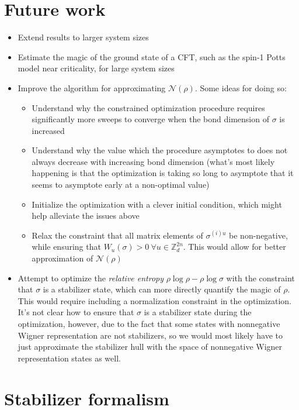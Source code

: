 \documentclass{article}
\begin{document}
\section{Future work}

\begin{itemize}
\item Extend results to larger system sizes
\item Estimate the magic of the ground state of a CFT, such as the spin-1 Potts model near criticality, for large system sizes
\item Improve the algorithm for approximating $\mathcal N(\rho)$. Some ideas for doing so:
	\begin{itemize}
	\item Understand why the constrained optimization procedure requires significantly more sweeps to converge when the bond dimension of $\sigma$ is increased
	\item Understand why the value which the procedure asymptotes to does not always decrease with increasing bond dimension (what's most likely happening is that the optimization is taking so long to asymptote that it seems to asymptote early at a non-optimal value)
	\item Initialize the optimization with a clever initial condition, which might help alleviate the issues above
	\item Relax the constraint that all matrix elements of $\sigma^{(i)u}$ be non-negative, while ensuring that $W_u(\sigma)>0\ \forall u\in \mathbb Z_d^{2n}$. This would allow for better approximation of $\mathcal N(\rho)$
	\end{itemize}
\item Attempt to optimize the \textit{relative entropy} \cite{Veitch_2014} $\rho \log \rho - \rho \log \sigma$ with the constraint that $\sigma$ is a stabilizer state, which can more directly quantify the magic of $\rho$. This would require including a normalization constraint in the optimization. It's not clear how to ensure that $\sigma$ is a stabilizer state during the optimization, however, due to the fact that some states with nonnegative Wigner representation are not stabilizers, so we would most likely have to just approximate the stabilizer hull with the space of nonnegative Wigner representation states as well. 
\end{itemize}



\pagebreak

\appendix

\section{Stabilizer formalism}
\end{document}
